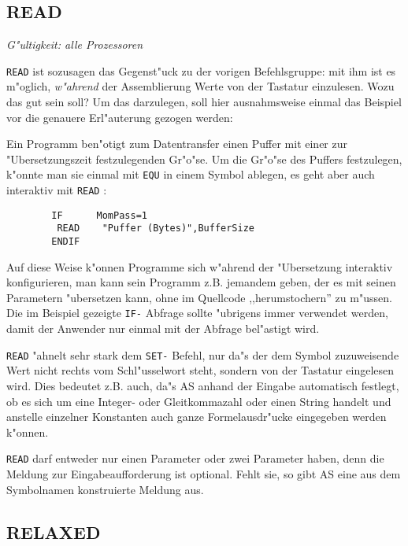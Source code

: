 \documentclass[12pt,a4paper,twoside]{report}
\makeatletter
\newcommand{\ii}[1]{{\it #1}}
\newcommand{\tty}[1]{{\tt #1}}
\newcommand{\ttindex}[1]{\index{#1@{\tt #1}}}
\makeatother
\begin{document}

\subsection{READ}
\ttindex{READ}

{\em G"ultigkeit: alle Prozessoren}

\tty{READ} ist sozusagen das Gegenst"uck zu der vorigen Befehlsgruppe: mit
ihm ist es m"oglich, \ii{w"ahrend} der Assemblierung Werte von der
Tastatur einzulesen.  Wozu das gut sein soll?  Um das darzulegen, soll
hier ausnahmsweise einmal das Beispiel vor die genauere Erl"auterung
gezogen werden:
\par
Ein Programm ben"otigt zum Datentransfer einen Puffer mit einer zur
"Ubersetzungszeit festzulegenden Gr"o"se.  Um die Gr"o"se des Puffers
festzulegen, k"onnte man sie einmal mit \tty{EQU} in einem Symbol
ablegen, es geht aber auch interaktiv mit \tty{READ} :
\begin{verbatim}
        IF      MomPass=1
         READ    "Puffer (Bytes)",BufferSize
        ENDIF
\end{verbatim}
Auf diese Weise k"onnen Programme sich w"ahrend der "Ubersetzung
interaktiv konfigurieren, man kann sein Programm z.B. jemandem geben,
der es mit seinen Parametern "ubersetzen kann, ohne im Quellcode
,,herumstochern'' zu m"ussen.  Die im Beispiel gezeigte \tty{IF-}
Abfrage sollte "ubrigens immer verwendet werden, damit der Anwender
nur einmal mit der Abfrage bel"astigt wird.
\par
\tty{READ} "ahnelt sehr stark dem \tty{SET-} Befehl, nur da"s der
dem Symbol zuzuweisende Wert nicht rechts vom Schl"usselwort steht,
sondern von der Tastatur eingelesen wird.  Dies bedeutet z.B. auch,
da"s AS anhand der Eingabe automatisch festlegt, ob es sich um eine
Integer- oder Gleitkommazahl oder einen String handelt und anstelle
einzelner Konstanten auch ganze Formelausdr"ucke eingegeben werden
k"onnen.
\par
\tty{READ} darf entweder nur einen Parameter oder zwei Parameter
haben, denn die Meldung zur Eingabeaufforderung ist optional.  Fehlt
sie, so gibt AS eine aus dem Symbolnamen konstruierte Meldung aus.


\subsection{RELAXED}
\label{SectRELAXED}
\ttindex{RELAXED}
\end{document}
